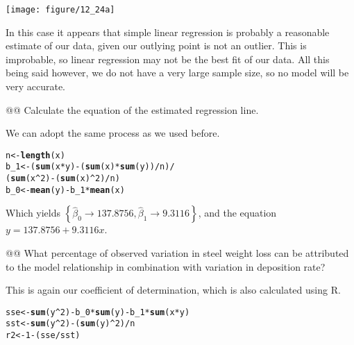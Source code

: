 \documentclass[10pt]{article}\usepackage[]{graphicx}\usepackage[]{xcolor}
\makeatletter
\def\maxwidth{ %
  \ifdim\Gin@nat@width>\linewidth
    \linewidth
  \else
    \Gin@nat@width
  \fi
}
\newcommand{\hlnum}[1]{\textcolor[rgb]{0.686,0.059,0.569}{#1} }%
\newcommand{\hlopt}[1]{\textcolor[rgb]{0,0,0}{#1} }%
\newcommand{\hlstd}[1]{\textcolor[rgb]{0.345,0.345,0.345}{#1} }%
\newcommand{\hlkwb}[1]{\textcolor[rgb]{0.69,0.353,0.396}{#1} }%
\newcommand{\hlkwd}[1]{\textcolor[rgb]{0.737,0.353,0.396}{\textbf{#1} } }%
\newenvironment{kframe}{%
 \def\at@end@of@kframe{}%
 \ifinner\ifhmode%
  \def\at@end@of@kframe{\end{minipage} }%
  \begin{minipage}{\columnwidth}%
 \fi\fi%
 \def\FrameCommand##1{\hskip\@totalleftmargin \hskip-\fboxsep
 \colorbox{shadecolor}{##1}\hskip-\fboxsep
     \hskip-\linewidth \hskip-\@totalleftmargin \hskip\columnwidth}%
 \MakeFramed {\advance\hsize-\width
   \@totalleftmargin\z@ \linewidth\hsize
   \@setminipage} }%
 {\par\unskip\endMakeFramed%
 \at@end@of@kframe}
\newenvironment{knitrout}{}{} %
\makeatother
\begin{document}
\begin{easylist}[enumerate]
\begin{knitrout}
{\centering \texttt{[image: figure/12\_24a]} 

}



\end{knitrout}


    In this case it appears that simple linear regression is probably a reasonable estimate of our data, given our
    outlying point is not an outlier. This is improbable, so linear regression may not be the best fit of our data. All
    this being said however, we do not have a very large sample size, so no model will be very accurate.

    @@ Calculate the equation of the estimated regression line.\newline

    We can adopt the same process as we used before.

\begin{knitrout}
\color{fgcolor}\begin{kframe}
\begin{alltt}
         \hlstd{n} \hlkwb{<-} \hlkwd{length}\hlstd{(x)}
         \hlstd{b_1} \hlkwb{<-} \hlstd{(}\hlkwd{sum}\hlstd{(x} \hlopt{*} \hlstd{y)} \hlopt{-} \hlstd{(}\hlkwd{sum}\hlstd{(x)} \hlopt{*} \hlkwd{sum}\hlstd{(y))}\hlopt{/}\hlstd{n)} \hlopt{/}
                 \hlstd{(}\hlkwd{sum}\hlstd{(x}\hlopt{^}\hlnum{2}\hlstd{)} \hlopt{-} \hlstd{(}\hlkwd{sum}\hlstd{(x)}\hlopt{^}\hlnum{2}\hlstd{)}\hlopt{/}\hlstd{n)}
         \hlstd{b_0} \hlkwb{<-} \hlkwd{mean}\hlstd{(y)} \hlopt{-} \hlstd{b_1} \hlopt{*} \hlkwd{mean}\hlstd{(x)}
\end{alltt}
\end{kframe}
\end{knitrout}


    Which yields $\boxed{\left\{ \hat{\beta}_0 \to 137.8756, \hat{\beta}_1 \to 9.3116 \right\} }$, and the
    equation $y = 137.8756 + 9.3116 x$.

    @@ What percentage of observed variation in steel weight loss can be attributed to the model relationship in
    combination with variation in deposition rate?\newline

    This is again our coefficient of determination, which is also calculated using R.

\begin{knitrout}
\color{fgcolor}\begin{kframe}
\begin{alltt}
         \hlstd{sse} \hlkwb{<-} \hlkwd{sum}\hlstd{(y}\hlopt{^}\hlnum{2}\hlstd{)} \hlopt{-} \hlstd{b_0} \hlopt{*} \hlkwd{sum}\hlstd{(y)} \hlopt{-} \hlstd{b_1} \hlopt{*} \hlkwd{sum}\hlstd{(x} \hlopt{*} \hlstd{y)}
         \hlstd{sst} \hlkwb{<-} \hlkwd{sum}\hlstd{(y}\hlopt{^}\hlnum{2}\hlstd{)} \hlopt{-} \hlstd{(}\hlkwd{sum}\hlstd{(y)}\hlopt{^}\hlnum{2}\hlstd{)}\hlopt{/}\hlstd{n}
         \hlstd{r2} \hlkwb{<-} \hlnum{1} \hlopt{-}\hlstd{(sse} \hlopt{/} \hlstd{sst)}
\end{alltt}
\end{kframe}
\end{knitrout}



\end{easylist}
\end{document}
